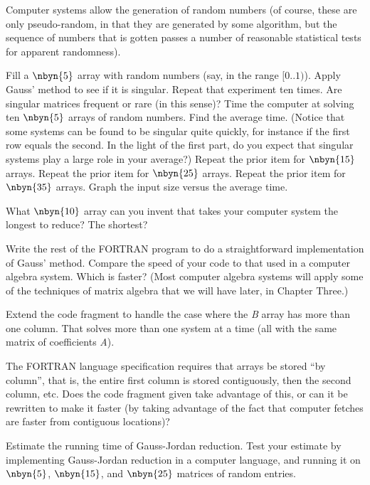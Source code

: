 \begin{exercises}
  \item Computer systems allow the generation of random numbers
    (of course, these are only pseudo-random, in that they are
    generated by some algorithm, but the sequence of numbers that is
    gotten passes a number of reasonable statistical tests for
    apparent randomness).
    \begin{exparts}
      \partsitem Fill a $\nbyn{5}$ array with random numbers (say, in the
        range $[0..1)$).
        Apply Gauss' method to see if it is singular.
        Repeat that experiment ten times.
        Are singular matrices frequent or rare (in this sense)?
      \partsitem Time the computer at solving ten $\nbyn{5}$
        arrays of random numbers.
        Find the average time.
        (Notice that some systems can be found to be singular quite
        quickly, for instance if the first row equals the second.
        In the light of the first part, do you expect that 
        singular systems play a
        large role in your average?)
      \partsitem Repeat the prior item for $\nbyn{15}$ arrays.
      \partsitem Repeat the prior item for $\nbyn{25}$ arrays.
      \partsitem Repeat the prior item for $\nbyn{35}$ arrays.
      \partsitem Graph the input size versus the average time.
    \end{exparts}
  \item What $\nbyn{10}$ array can you invent that takes your computer
    system the longest to reduce?
    The shortest?
  \item Write the rest of the FORTRAN program to do a
    straightforward implementation of Gauss' method.
    Compare the speed of your code to that used in a computer algebra
    system.
    Which is faster?
    (Most computer algebra systems will apply some of the techniques
    of matrix algebra that we will have later, in Chapter Three.)
  \item Extend the code fragment to handle the case where the \textit{B} array
    has more than one column.
    That solves more than one system at a time (all with the same
    matrix of coefficients \textit{A}). 
  \item The FORTRAN language specification requires that arrays be
    stored ``by column'', that is, the entire first column is stored
    contiguously, then the second column, etc.
    Does the code fragment given take advantage of this,
    or can it be rewritten to make it faster (by taking advantage of
    the fact that computer fetches are faster from contiguous locations)?
  \item Estimate the running time of Gauss-Jordan reduction.
    Test your estimate by implementing Gauss-Jordan reduction 
    in a computer language, and running it on $\nbyn{5}$, $\nbyn{15}$,
    and $\nbyn{25}$ matrices of random entries.
\end{exercises}
\endinput
